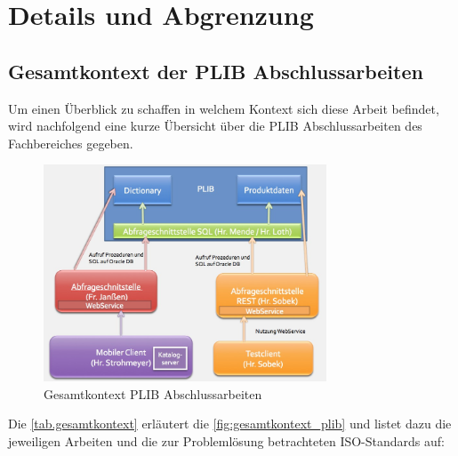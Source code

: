 \section{Details und Abgrenzung}

\subsection{Gesamtkontext der PLIB Abschlussarbeiten}

Um einen Überblick zu schaffen in welchem Kontext sich diese Arbeit befindet, wird nachfolgend eine kurze Übersicht über die PLIB Abschlussarbeiten des Fachbereiches gegeben.


\begin{figure}[htbp]
	\centering
		\includegraphics[width=0.75\textwidth]{images/gesamtkontext_plib.jpg}
	\caption{Gesamtkontext PLIB Abschlussarbeiten}
	\label{fig:gesamtkontext_plib}
\end{figure}

Die \autoref{tab.gesamtkontext} erläutert die \autoref{fig:gesamtkontext_plib} und listet dazu die jeweiligen Arbeiten und die zur Problemlösung betrachteten ISO-Standards auf: 

